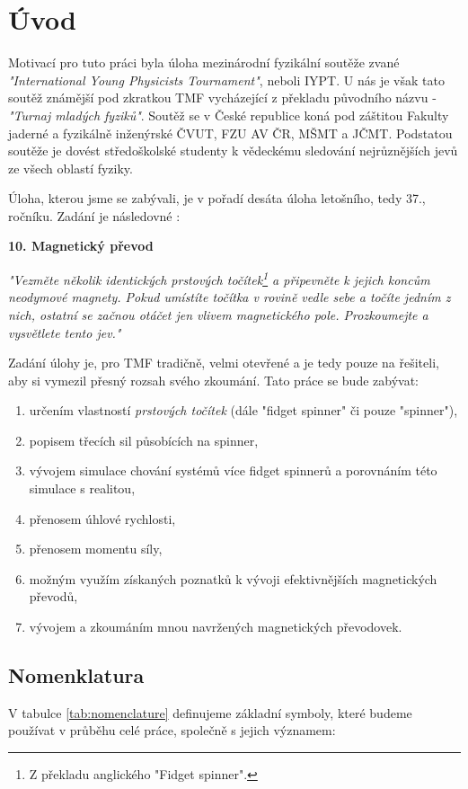 
\chapter{Úvod}
\label{chap:introduction}
Motivací pro tuto práci byla úloha mezinárodní fyzikální soutěže zvané \textit{"International Young Physicists Tournament"}, neboli IYPT.
U nás je však tato soutěž známější pod zkratkou TMF vycházející z překladu původního názvu - \textit{"Turnaj mladých fyziků"}.
Soutěž se v České republice koná pod záštitou Fakulty jaderné a fyzikálně inženýrské ČVUT, FZU AV ČR, MŠMT a JČMT. Podstatou soutěže je dovést středoškolské studenty k vědeckému sledování nejrůznějších jevů ze všech oblastí fyziky.

Úloha, kterou jsme se zabývali, je v pořadí desáta úloha letošního, tedy 37., ročníku. Zadání je následovné \cite{tmf_tasks}:

\textbf{10. Magnetický převod}

\textit{"Vezměte několik identických prstových točítek\footnote{Z překladu anglického "Fidget spinner".} a připevněte k jejich koncům neodymové magnety. Pokud umístíte točítka v rovině vedle sebe a točíte jedním z nich, ostatní se začnou otáčet jen vlivem magnetického pole. Prozkoumejte a vysvětlete tento jev."}

Zadání úlohy je, pro TMF tradičně, velmi otevřené a je tedy pouze na řešiteli, aby si vymezil přesný rozsah svého zkoumání.
Tato práce se bude zabývat:

\begin{enumerate}[topsep=0pt, partopsep=0pt]
    \setlength{\itemsep}{0pt}%
    \setlength{\parskip}{0pt}%
    \item určením vlastností \textit{prstových točítek} (dále "fidget spinner" či pouze "spinner"),
    \item popisem třecích sil působících na spinner,
    \item vývojem simulace chování systémů více fidget spinnerů a porovnáním této simulace s realitou,
    \item přenosem úhlové rychlosti,
    \item přenosem momentu síly,
    \item možným využím získaných poznatků k vývoji efektivnějších magnetických převodů,
    \item vývojem a zkoumáním mnou navržených magnetických převodovek.
\end{enumerate}

\clearpage

\section[Nomenklatura]{Nomenklatura}
\label{sec:nomenclature}
V tabulce \ref{tab:nomenclature} definujeme základní symboly, které budeme používat v průběhu celé práce, společně s jejich významem:

